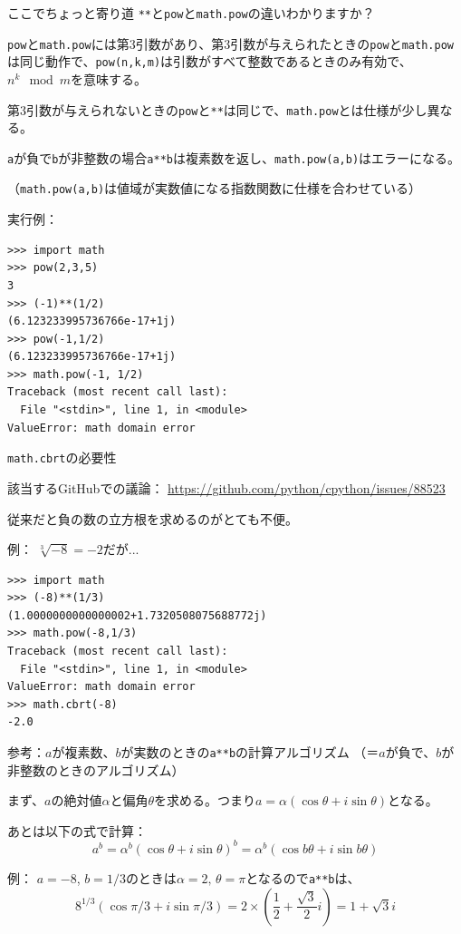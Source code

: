 \documentclass[unicode,lualatex,aspectratio=169]{beamer}
\begin{document}
\begin{frame}[fragile]{ここでちょっと寄り道}
  \verb|**|と\verb|pow|と\verb|math.pow|の違いわかりますか？\vspace{7mm}

  
  \verb|pow|と\verb|math.pow|には第3引数があり、第3引数が与えられたときの\verb|pow|と\verb|math.pow|は同じ動作で、\verb|pow(n,k,m)|は引数がすべて整数であるときのみ有効で、$n^k \mod m$を意味する。

  第3引数が与えられないときの\verb|pow|と\verb|**|は同じで、\verb|math.pow|とは仕様が少し異なる。

  \verb|a|が負で\verb|b|が非整数の場合\verb|a**b|は複素数を返し、\verb|math.pow(a,b)|はエラーになる。

  （\verb|math.pow(a,b)|は値域が実数値になる指数関数に仕様を合わせている）
\end{frame}
\begin{frame}[fragile]
  実行例：
\fontsize{8pt}{8pt}\selectfont
\begin{verbatim}
>>> import math
>>> pow(2,3,5)
3
>>> (-1)**(1/2)
(6.123233995736766e-17+1j)
>>> pow(-1,1/2)
(6.123233995736766e-17+1j)
>>> math.pow(-1, 1/2)
Traceback (most recent call last):
  File "<stdin>", line 1, in <module>
ValueError: math domain error
\end{verbatim}
\end{frame}
\begin{frame}[fragile]{{\tt math.cbrt}の必要性}

    {\tiny 該当するGitHubでの議論： \url{https://github.com/python/cpython/issues/88523}}

  
  従来だと負の数の立方根を求めるのがとても不便。

  例：
  $\sqrt[3]{-8}=-2$だが...

{\fontsize{8pt}{8pt}\selectfont
\begin{verbatim}
>>> import math
>>> (-8)**(1/3)
(1.0000000000000002+1.7320508075688772j)
>>> math.pow(-8,1/3)
Traceback (most recent call last):
  File "<stdin>", line 1, in <module>
ValueError: math domain error
>>> math.cbrt(-8)
-2.0
\end{verbatim}
}
\end{frame}
\begin{frame}[fragile]
  参考：$a$が複素数、$b$が実数のときの\verb|a**b|の計算アルゴリズム\newline
  （＝$a$が負で、$b$が非整数のときのアルゴリズム）

  まず、$a$の絶対値$\alpha$と偏角$\theta$を求める。つまり$a=\alpha (\cos\theta + i \sin\theta)$となる。
  
  あとは以下の式で計算：
  \[
    a^b = \alpha^b (\cos\theta + i \sin\theta)^b
    =\alpha^b (\cos b\theta + i \sin b\theta)
  \]

  例：
  $a=-8$, $b=1/3$のときは$\alpha=2,\,\theta=\pi$となるので\verb|a**b|は、
  \[
    8^{1/3} (\cos \pi/3 + i \sin \pi/3)
    =2\times\left( \frac{1}{2} + \frac{\sqrt{3}}{2}i \right)
    =1+\sqrt{3}i
  \]  
\end{frame}
\end{document}
